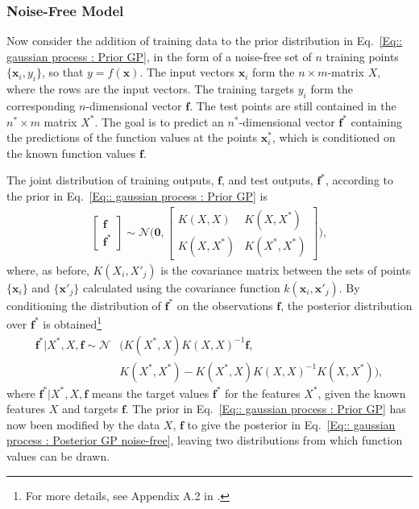 \documentclass[twoside,english]{uiofysmaster}
\begin{document}
\subsubsection{Noise-Free Model}

Now consider the addition of training data to the prior distribution in Eq.~\ref{Eq:: gaussian process : Prior GP}, in the form of a noise-free set of $n$ training points $\{\textbf{x}_i, y_i\}$, so that $y = f(\textbf{x})$. The input vectors $\textbf{x}_i$ form the $n \times m$-matrix $X$, where the rows are the input vectors. The training targets $y_i$ form the corresponding $n$-dimensional vector $\textbf{f}$. The test points are still contained in the $n^* \times m$ matrix $X^*$. The goal is to predict an $n^*$-dimensional vector $\textbf{f}^*$ containing the predictions of the function values at the points $\textbf{x}^*_i$, which is conditioned on the known function values $\textbf{f}$. 

The joint distribution of training outputs, $\textbf{f}$, and test outputs, $\textbf{f}^*$, according to the prior in Eq.~\ref{Eq:: gaussian process : Prior GP} is
\begin{align}
\begin{bmatrix}
\textbf{f}\\
\textbf{f}^*
\end{bmatrix}
\sim 
\mathcal{N} \Bigg(
\boldsymbol{0},
\begin{bmatrix}
K(X, X) & K(X, X^*)\\
K(X, X^*) & K(X^*, X^*)
\end{bmatrix}
 \Bigg),
\end{align}
where, as before, $K(X_i, X'_j)$ is the covariance matrix between the sets of points $\{ \textbf{x}_i \}$ and $\{\textbf{x}'_j \}$ calculated using the covariance function $k(\textbf{x}_i, \textbf{x}'_j)$. By conditioning the distribution of $\textbf{f}^*$ on the observations $\textbf{f}$,  the posterior distribution over $\textbf{f}^*$ is obtained\footnote{For more details, see Appendix A.2 in \cite{rasmussen2006gaussian}.}  \cite{rasmussen2006gaussian} 
\begin{align}\label{Eq:: gaussian process : Posterior GP noise-free}
\textbf{f}^* \big| X^*, X, \textbf{f} \sim \mathcal{N}&(K(X^*, X)K(X, X)^{-1} \textbf{f},\\ &K(X^*, X^*) - K(X^*, X)K(X, X)^{-1}K(X, X^*)),
\end{align}
where $\textbf{f}^* | X^*, X, \textbf{f}$ means the target values $\textbf{f}^*$ for the features $X^*$, given the known features $X$ and targets $\textbf{f}$. The prior in Eq.~\ref{Eq:: gaussian process : Prior GP} has now been modified by the data $X$, $\textbf{f}$ to give the posterior in Eq.~\ref{Eq:: gaussian process : Posterior GP noise-free}, leaving two distributions from which function values can be drawn.
\end{document}

